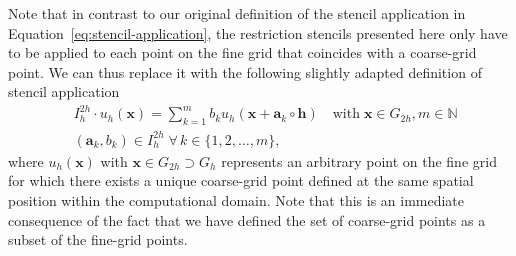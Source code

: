 Note that in contrast to our original definition of the stencil application in Equation~\eqref{eq:stencil-application}, the restriction stencils presented here only have to be applied to each point on the fine grid that coincides with a coarse-grid point.
We can thus replace it with the following slightly adapted definition of stencil application
\begin{equation}
	\begin{split}
		& I_{h}^{2h} \cdot u_h(\bm{x}) = \sum_{k=1}^m b_k u_h({\bm x + \bm{a}_k} \circ \bm{h}) \quad 
		\text{with} \; \bm{x} \in G_{2h}, m \in \mathbb{N} \\ & (\bm{a}_k, b_k) \in I_{h}^{2h} \; \forall \, k \in \{ 1, 2, \dots, m \},
	\end{split}
	\label{eq:stencil-restriction-application}
\end{equation}
where $u_h(\bm{x})$ with $\bm{x} \in G_{2h} \supset G_h$ represents an arbitrary point on the fine grid for which there exists a unique coarse-grid point defined at the same spatial position within the computational domain.
Note that this is an immediate consequence of the fact that we have defined the set of coarse-grid points as a subset of the fine-grid points.


